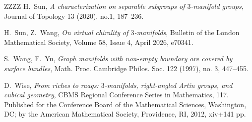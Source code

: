 \documentclass{amsart}
\numberwithin{equation}{section}
\theoremstyle{definition}
\begin{document}
\begin{thebibliography}{ZZZZ}
 {H.~Sun}, {\it A characterization on separable subgroups of $3$-manifold groups}, Journal of Topology 13 (2020), no.1, 187--236.

 {H.~Sun, Z.~Wang}, {\it On virtual chirality of $3$-manifolds}, Bulletin of the London Mathematical Society, Volume 58, Issue 4, April 2026, e70341.





 {S.~Wang, F.~Yu}, {\it Graph manifolds with non-empty boundary are covered by surface bundles},
Math. Proc. Cambridge Philos. Soc. 122 (1997), no. 3, 447--455.


 {D.~Wise}, {\it From riches to raags: $3$-manifolds, right-angled Artin groups, and cubical geometry}, CBMS Regional Conference Series in Mathematics, 117. Published for the Conference Board of the Mathematical Sciences, Washington, DC; by the American Mathematical Society, Providence, RI, 2012, xiv+141 pp.


\end{thebibliography}
\end{document}
